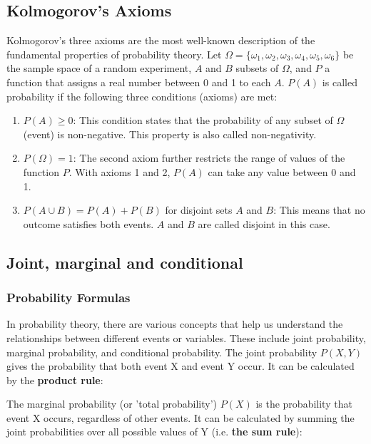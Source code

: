\subsection{Kolmogorov's Axioms}\label{Kolmogorov's Axioms}
Kolmogorov's three axioms are the most well-known description of the fundamental properties of probability theory. Let $\Omega = \{\omega_1, \omega_2, \omega_3, \omega_4, \omega_5, \omega_6\}$ be the sample space of a random experiment, $A$ and $B$ subsets of $\Omega$, and $P$ a function that assigns a real number between 0 and 1 to each $A$. $P(A)$ is called probability if the following three conditions (axioms) are met:
\begin{enumerate}
    \item $P(A) \geq 0$: This condition states that the probability of any subset of $\Omega$ (event) is non-negative. This property is also called non-negativity.
    \item $P(\Omega) = 1$: The second axiom further restricts the range of values of the function $P$. With axioms 1 and 2, $P(A)$ can take any value between 0 and 1.
    \item $P(A \cup B) = P(A) + P(B)$ for disjoint sets $A$ and $B$: This means that no outcome satisfies both events. $A$ and $B$ are called disjoint in this case.
\end{enumerate}

\subsection{Joint, marginal and conditional}\label{Joint, marginal and conditional}

\subsubsection{Probability Formulas}\label{Probability Formulas}

In probability theory, there are various concepts that help us understand the relationships between different events or variables. These include joint probability, marginal probability, and conditional probability. The joint probability $P(X, Y)$ gives the probability that both event X and event Y occur. It can be calculated by the \textbf{product rule}:


The marginal probability (or 'total probability') $P(X)$ is the probability that event X occurs, regardless of other events. It can be calculated by summing the joint probabilities over all possible values of Y (i.e. \textbf{the sum rule}):

